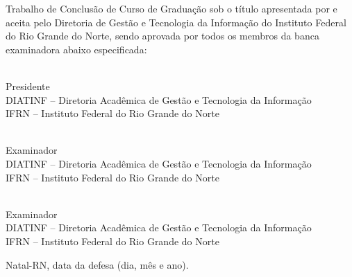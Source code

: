 \begin{folhadeaprovacao}
	\setlength{\ABNTsignthickness}{0.4pt}
	\setlength{\ABNTsignwidth}{10cm}
	
	\noindent 
	Trabalho de Conclusão de Curso de Graduação sob o título
	\textit{\thesistitle} apresentada por \thesisauthor e aceita pelo Diretoria
	de Gestão e Tecnologia da Informação do Instituto Federal do Rio Grande do
	Norte, sendo aprovada por todos os membros da banca examinadora abaixo especificada:
		
	\assinatura
	{
		\thesissupervisor   			                  \\
		{\small Presidente}											          \smallskip\\ 
		{\footnotesize
			DIATINF -- Diretoria Acadêmica de Gestão e Tecnologia da Informação		   \\
		  	IFRN -- Instituto Federal do Rio Grande do Norte
		}
   }
      
   \assinatura
	{
		\thesisdefencecommitteemembershipone   			                  \\
		{\small Examinador}											          \smallskip\\ 
		{\footnotesize
			DIATINF -- Diretoria Acadêmica de Gestão e Tecnologia da Informação		   \\
			IFRN -- Instituto Federal do Rio Grande do Norte
		}
   }   
   
   \assinatura
	{
		\thesisdefencecommitteemembershiptwo   			                  \\
		{\small Examinador}											          \smallskip\\ 
		{\footnotesize
			DIATINF -- Diretoria Acadêmica de Gestão e Tecnologia da Informação		   \\
			IFRN -- Instituto Federal do Rio Grande do Norte
		}
	}
		
	\vfill
	
	\begin{center}
		Natal-RN, data da defesa (dia, mês e ano).
	\end{center}
\end{folhadeaprovacao}
